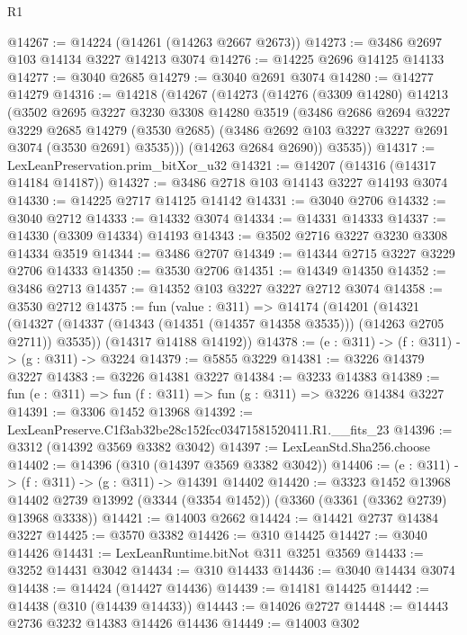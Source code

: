 \begin{lexlean}{R1}
\begin{coremodule}
@14267 := @14224 (@14261 (@14263 @2667 @2673))
@14273 := @3486 @2697 @103 @14134 @3227 @14213 @3074
@14276 := @14225 @2696 @14125 @14133
@14277 := @3040 @2685
@14279 := @3040 @2691 @3074
@14280 := @14277 @14279
@14316 := @14218
    (@14267
      (@14273
        (@14276
          (@3309 @14280)
          @14213
          (@3502
            @2695
            @3227
            @3230
            @3308
            @14280
            @3519
            (@3486
              @2686
              @2694
              @3227
              @3229
              @2685
              @14279
              (@3530 @2685)
              (@3486 @2692 @103 @3227 @3227 @2691 @3074 (@3530 @2691) @3535)))
          (@14263 @2684 @2690))
        @3535))
@14317 := LexLeanPreservation.prim_bitXor_u32
@14321 := @14207 (@14316 (@14317 @14184 @14187))
@14327 := @3486 @2718 @103 @14143 @3227 @14193 @3074
@14330 := @14225 @2717 @14125 @14142
@14331 := @3040 @2706
@14332 := @3040 @2712
@14333 := @14332 @3074
@14334 := @14331 @14333
@14337 := @14330 (@3309 @14334) @14193
@14343 := @3502 @2716 @3227 @3230 @3308 @14334 @3519
@14344 := @3486 @2707
@14349 := @14344 @2715 @3227 @3229 @2706 @14333
@14350 := @3530 @2706
@14351 := @14349 @14350
@14352 := @3486 @2713
@14357 := @14352 @103 @3227 @3227 @2712 @3074
@14358 := @3530 @2712
@14375 := fun (value : @311) =>
  @14174
    (@14201
      (@14321 (@14327 (@14337 (@14343 (@14351 (@14357 @14358 @3535))) (@14263 @2705 @2711)) @3535))
      (@14317 @14188 @14192))
@14378 := (e : @311) -> (f : @311) -> (g : @311) -> @3224
@14379 := @5855 @3229
@14381 := @3226 @14379 @3227
@14383 := @3226 @14381 @3227
@14384 := @3233 @14383
@14389 := fun (e : @311) => fun (f : @311) => fun (g : @311) => @3226 @14384 @3227
@14391 := @3306 @1452 @13968
@14392 := LexLeanPreserve.C1f3ab32be28c152fcc03471581520411.R1.__fits_23
@14396 := @3312 (@14392 @3569 @3382 @3042)
@14397 := LexLeanStd.Sha256.choose
@14402 := @14396 (@310 (@14397 @3569 @3382 @3042))
@14406 := (e : @311) -> (f : @311) -> (g : @311) -> @14391 @14402
@14420 := @3323
    @1452
    @13968
    @14402
    @2739
    @13992
    (@3344 (@3354 @1452))
    (@3360 (@3361 (@3362 @2739) @13968 @3338))
@14421 := @14003 @2662
@14424 := @14421 @2737 @14384 @3227
@14425 := @3570 @3382
@14426 := @310 @14425
@14427 := @3040 @14426
@14431 := LexLeanRuntime.bitNot @311 @3251 @3569
@14433 := @3252 @14431 @3042
@14434 := @310 @14433
@14436 := @3040 @14434 @3074
@14438 := @14424 (@14427 @14436)
@14439 := @14181 @14425
@14442 := @14438 (@310 (@14439 @14433))
@14443 := @14026 @2727
@14448 := @14443 @2736 @3232 @14383 @14426 @14436
@14449 := @14003 @302

\end{coremodule}
\end{lexlean}
